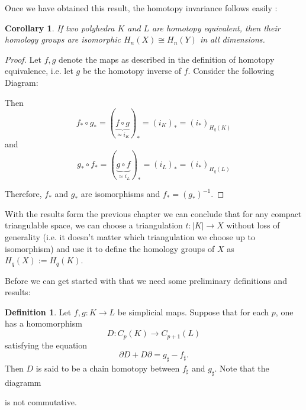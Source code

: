 \documentclass[toc=bib, headinclude]{scrartcl}
\theoremstyle{plain}
\newtheorem{corollary}[theorem]{Corollary}
\theoremstyle{definition}
\newtheorem	{definition}[theorem]{Definition}
\theoremstyle{remark}
\newcommand{\isom}{\cong}
\begin{document}
Once we have obtained this result, the homotopy invariance follows easily \parencite[see][Theorem 8.11]{ar}:
\begin{corollary}
	If two polyhedra $K$ and $L$ are homotopy equivalent, then their homology groups are isomorphic $H_n(X)\isom H_n(Y)$ in all dimensions.
\end{corollary}
\begin{proof}
	Let $f,g$ denote the maps as described in the definition of homotopy equivalence, i.e. let $g$ be the homotopy inverse of $f$. 
	Consider the following Diagram:
	\begin{center}
	
	\end{center}

	Then 
	\[f_\ast\circ g_\ast=(\underset{\ensuremath{\simeq i_K}}{\underbrace{f\circ g}})_\ast=(i_K)_\ast=(i_\ast)_{H_q(K)}\]
	and
	\[g_\ast\circ f_\ast=(\underset{\ensuremath{\simeq i_L}}{\underbrace{g\circ f}})_\ast=(i_L)_\ast=(i_\ast)_{H_q(L)}\]
	
	Therefore, $f_\ast$ and $g_\ast$ are isomorphisms and $f_\ast=(g_\ast)^{-1}$.
\end{proof}

With the results form the previous chapter we can conclude that for any compact triangulable space, we can choose a triangulation $t:|K|\to X$ without loss of generality (i.e. it doesn't matter which triangulation we choose up to isomorphism) and use it to define the homology groups  of $X$ as $H_q(X):=H_q(K)$.



Before we can get started with that we need some preliminary definitions and results:


\begin{definition}
	Let $f,g:K\to L$ be simplicial maps. Suppose that for each $p$, one has a homomorphism \[
	D: C_p(K)\to C_{p+1}(L)
	\] satisfying the equation
	\[
	\partial D+D\partial=g_\sharp-f_\sharp.
	\]
	Then $D$ is said to be a chain homotopy between $f_\sharp$ and $g_\sharp$. Note that the diagramm
	\begin{center}
		
	\end{center}
	is not commutative.
\end{definition}
\end{document}
